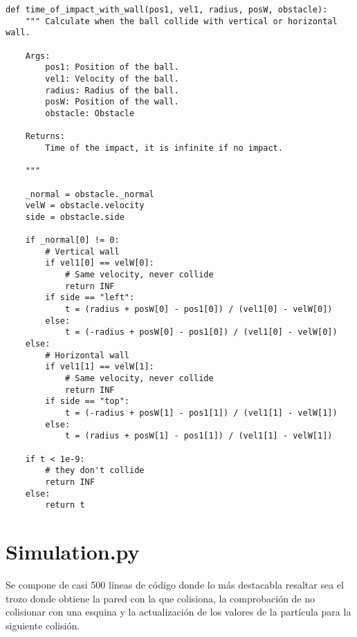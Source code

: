 \begin{lstlisting}[breaklines]
def time_of_impact_with_wall(pos1, vel1, radius, posW, obstacle):
    """ Calculate when the ball collide with vertical or horizontal wall.

    Args:
        pos1: Position of the ball.
        vel1: Velocity of the ball.
        radius: Radius of the ball.
        posW: Position of the wall.
        obstacle: Obstacle

    Returns:
        Time of the impact, it is infinite if no impact.

    """

    _normal = obstacle._normal
    velW = obstacle.velocity
    side = obstacle.side

    if _normal[0] != 0:
        # Vertical wall
        if vel1[0] == velW[0]:
            # Same velocity, never collide
            return INF
        if side == "left":
            t = (radius + posW[0] - pos1[0]) / (vel1[0] - velW[0])
        else:
            t = (-radius + posW[0] - pos1[0]) / (vel1[0] - velW[0])
    else:
        # Horizontal wall
        if vel1[1] == velW[1]:
            # Same velocity, never collide
            return INF
        if side == "top":
            t = (-radius + posW[1] - pos1[1]) / (vel1[1] - velW[1])
        else:
            t = (radius + posW[1] - pos1[1]) / (vel1[1] - velW[1])

    if t < 1e-9:
        # they don't collide
        return INF
    else:
        return t
\end{lstlisting}

\section*{Simulation.py}

Se compone de casi 500 líneas de código donde lo más destacabla resaltar sea el trozo donde obtiene la pared con la que colisiona, la comprobación de no colisionar con una esquina y la actualización de los valores de la partícula para la siguiente colisión.

